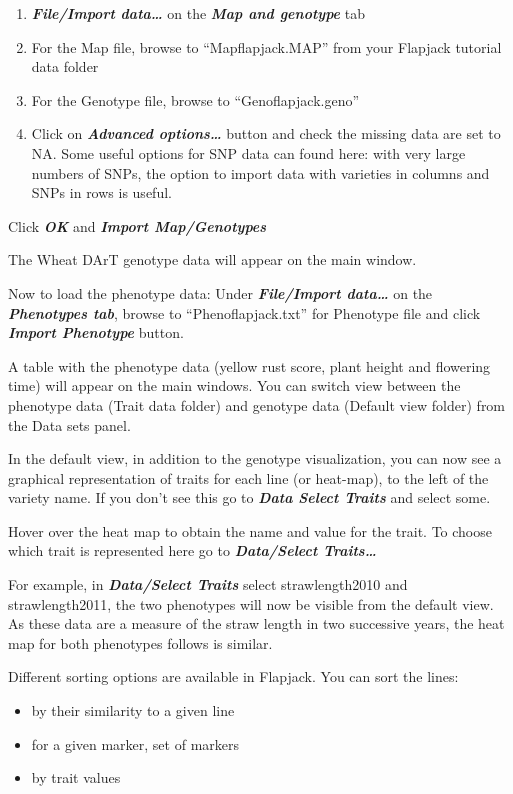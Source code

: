 \documentclass[
]{book}
\providecommand{\tightlist}{%
  \setlength{\itemsep}{0pt}\setlength{\parskip}{0pt}}
\begin{document}
\begin{enumerate}
\def\labelenumi{\arabic{enumi}.}
\tightlist
\item
  \textbf{\emph{File/Import data\ldots{}}} on the \textbf{\emph{Map and genotype}} tab
\item
  For the Map file, browse to ``Mapflapjack.MAP'' from your Flapjack tutorial data folder
\item
  For the Genotype file, browse to ``Genoflapjack.geno''
\item
  Click on \textbf{\emph{Advanced options\ldots{}}} button and check the missing data are set to NA. Some useful options for SNP data can found here: with very large numbers of SNPs, the option to import data with varieties in columns and SNPs in rows is useful.
\end{enumerate}

Click \textbf{\emph{OK}} and \textbf{\emph{Import Map/Genotypes}}

The Wheat DArT genotype data will appear on the main window.

Now to load the phenotype data:
Under \textbf{\emph{File/Import data\ldots{}}} on the \textbf{\emph{Phenotypes tab}}, browse to ``Phenoflapjack.txt'' for Phenotype file and click \textbf{\emph{Import Phenotype}} button.

A table with the phenotype data (yellow rust score, plant height and flowering time) will appear on the main windows. You can switch view between the phenotype data (Trait data folder) and genotype data (Default view folder) from the Data sets panel.

In the default view, in addition to the genotype visualization, you can now see a graphical representation of traits for each line (or heat-map), to the left of the variety name. If you don't see this go to \textbf{\emph{Data Select Traits}} and select some.

Hover over the heat map to obtain the name and value for the trait. To choose which trait is represented here go to \textbf{\emph{Data/Select Traits\ldots{}}}

For example, in \textbf{\emph{Data/Select Traits}} select strawlength2010 and strawlength2011, the two phenotypes will now be visible from the default view. As these data are a measure of the straw length in two successive years, the heat map for both phenotypes follows is similar.

Different sorting options are available in Flapjack. You can sort the lines:

\begin{itemize}
\tightlist
\item
  by their similarity to a given line
\item
  for a given marker, set of markers
\item
  by trait values
\end{itemize}
\end{document}

